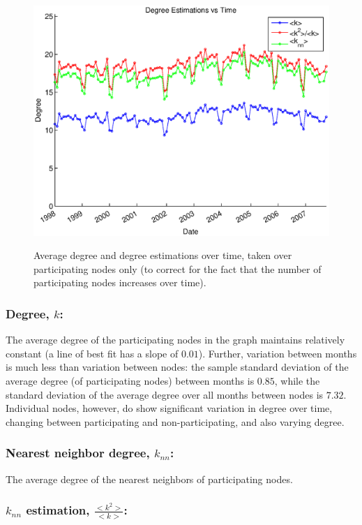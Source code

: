 \documentclass[12pt]{article}
\begin{document}
\begin{figure}[H]
\includegraphics[trim = 0cm 0cm 0cm 0cm, width = .9\textwidth]{Graficos/NearestNeighbors.eps}
\label{fig:k}
\caption{Average degree and degree estimations over time, taken over participating nodes only (to correct for the fact that the number of participating nodes increases over time). }
\label{fig:nn}
\end{figure}

\subsubsection*{Degree, \(k\):}

The average degree of the participating nodes in the graph maintains relatively constant (a line of best fit has a slope of \(0.01\)). Further, variation between months is much less than variation between nodes: the sample standard deviation of the average degree (of participating nodes) between months is \(0.85\), while the standard deviation of the average degree over all months between nodes is \(7.32\). Individual nodes, however, do show significant variation in degree over time, changing between participating and non-participating, and also varying degree.

\subsubsection*{Nearest neighbor degree, \(k_{nn}\):}

The average degree of the nearest neighbors of participating nodes. 

\subsubsection*{\(k_{nn}\) estimation, \(\frac{<k^2>}{<k>}\):}
\end{document}
